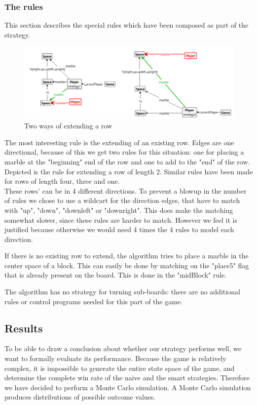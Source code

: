 \subsubsection{The rules}
This section describes the special rules which have been composed as part of the strategy.

\begin{figure}[!h]
  \includegraphics[scale=0.42,clip]{Images/twocombined.png}
  \caption{Two ways of extending a row}
  \label{fig:twocombined}
\end{figure}

The most interesting rule is the extending of an existing row. Edges are one directional, because of this we get two rules for this situation: one for placing a marble at the "beginning" end of the row and one to add to the "end" of the row. Depicted is the rule for extending a row of length 2. Similar rules have been made for rows of length four, three and one.\\
These rows' can be in 4 different directions. To prevent a blowup in the number of rules we chose to use a wildcart for the direction edges, that have to match with "up", "down", "downleft" or "downright".
This does make the matching somewhat slower, since these rules are harder to match. However we feel it is justified because otherwise we would need 4 times the 4 rules to model each direction.

\vspace{6pt}

If there is no existing row to extend, the algorithm tries to place a marble in the center space of a block. This can easily be done by matching on the "place5" flag that is already present on the board. This is done in the "midBlock" rule.

\vspace{6pt}

The algorithm has no strategy for turning sub-boards: there are no additional rules or control programs needed for this part of the game.


\subsection{Results}
To be able to draw a conclusion about whether our strategy performs well, we want to formally evaluate its performance.
Because the game is relatively complex, it is impossible to generate the entire state space of the game, and determine the complete win rate of the naive and the smart strategies.
Therefore we have decided to perform a Monte Carlo simulation. A Monte Carlo simulation produces distributions of possible outcome values.


